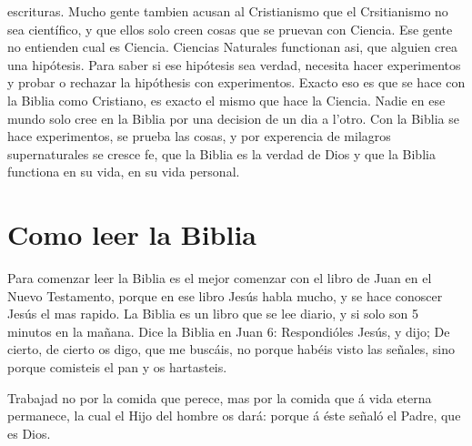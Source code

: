 escrituras. Mucho gente tambien acusan al Cristianismo que el
Crsitianismo no sea científico, y que ellos solo creen cosas que se
pruevan con Ciencia. Ese gente no entienden cual es Ciencia. Ciencias
Naturales functionan asi, que alguien crea una hipótesis. Para saber si
ese hipótesis sea verdad, necesita hacer experimentos y probar o
rechazar la hipóthesis con experimentos. Exacto eso es que se hace con
la Biblia como Cristiano, es exacto el mismo que hace la Ciencia. Nadie
en ese mundo solo cree en la Biblia por una decision de un dia a l'otro.
Con la Biblia se hace experimentos, se prueba las cosas, y por
experencia de milagros supernaturales se cresce fe, que la Biblia es la
verdad de Dios y que la Biblia functiona en su vida, en su vida
personal.

\hypertarget{como-leer-la-biblia}{%
\section{Como leer la Biblia}\label{como-leer-la-biblia}}

Para comenzar leer la Biblia es el mejor comenzar con el libro de Juan
en el Nuevo Testamento, porque en ese libro Jesús habla mucho, y se hace
conoscer Jesús el mas rapido. La Biblia es un libro que se lee diario, y
si solo son 5 minutos en la mañana. Dice la Biblia en Juan 6:
 Respondióles Jesús, y dijo; De cierto, de cierto os
digo, que me buscáis, no porque habéis visto las señales, sino porque
comisteis el pan y os hartasteis.

 Trabajad no por la comida que perece, mas por la comida
que á vida eterna permanece, la cual el Hijo del hombre os dará: porque
á éste señaló el Padre, que es Dios.

